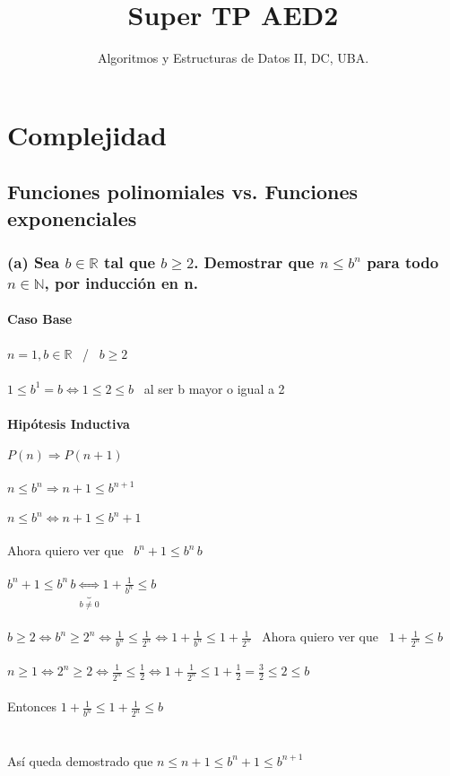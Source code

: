 \documentclass[10pt, a4paper]{article}
\author{Algoritmos y Estructuras de Datos II, DC, UBA.}
\date{}
\title{Super TP AED2}
\begin{document}
\maketitle

\section{Complejidad}

\subsection{Funciones polinomiales vs. Funciones exponenciales}
\subsubsection*{(a) Sea $b \in \mathbb{R}$ tal que $b \ge 2$. Demostrar que $n \le b^n$ para todo $n \in \mathbb{N}$, por inducción en n.}
\paragraph*{Caso Base}
$n = 1, b \in \mathbb{R}$ \ / \ $b \ge 2$ \\ \\
$1 \le b^1 = b \Leftrightarrow 1 \le 2 \le b$ \ al ser b mayor o igual a 2

\paragraph*{Hipótesis Inductiva}
$P(n) \Rightarrow P(n+1)$ \\ \\
$n \le b^n \Rightarrow n+1 \le b^{n+1}$ \\ \\
$n \le b^n \Leftrightarrow n+1 \le b^n+1$ \\ \\
 Ahora quiero ver que \ $b^n+1 \le b^n\,b$ \\ \\
$b^n+1 \le b^n\,b \underbrace{\Leftrightarrow}_{b \ne 0} 1+\frac{1}{b^n}\le b$ \\ \\
$b \ge 2 \Leftrightarrow b^n \ge 2^n \Leftrightarrow \frac{1}{b^n} \le \frac{1}{2^n} \Leftrightarrow \boxed{1+\frac{1}{b^n} \le 1+\frac{1}{2^n}}$ \ Ahora quiero ver que \ $1+\frac{1}{2^n} \le b$ \\ \\
$n \ge 1 \Leftrightarrow 2^n \ge 2 \Leftrightarrow \frac{1}{2^n} \le \frac{1}{2} \Leftrightarrow 1+\frac{1}{2^n} \le 1+\frac{1}{2} = \frac{3}{2} \le 2 \le b$ \\ \\
Entonces $\boxed{1+\frac{1}{b^n} \le 1+\frac{1}{2^n} \le b}$ \\\\ \\
Así queda demostrado que $n \le n+1 \le b^n+1 \le b^{n+1}$
\end{document}
